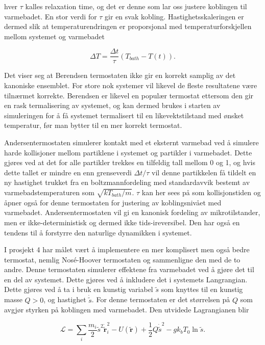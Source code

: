 \documentclass[a4paper,10pt]{article}
\newcommand{\Lagr}{\mathcal{L}}
\begin{document}
hver $\tau$ kalles relaxation time, og det er denne som lar oss justere koblingen til varmebadet. En stor verdi for $\tau$ gir en svak kobling. Hastighetsskaleringen er dermed slik at temperaturendringen er proporsjonal med temperaturforskjellen mellom systemet og varmebadet

\begin{equation}
 \Delta T = \frac{\Delta t}{\tau}(T_{bath} - T(t)).
\end{equation}

Det viser seg at Berendsen termostaten ikke gir en korrekt samplig av det kanoniske ensemblet. For store nok systemer vil likevel de fleste resultatene være tilnærmet korrekte. Berendsen er likevel en populær termostat ettersom den gir en rask termalisering av systemet, og kan dermed brukes i starten av simuleringen for å få systemet termalisert til en likevektstilstand med ønsket temperatur, før man bytter til en mer korrekt termostat.

Andersentermostaten simulerer kontakt med et eksternt varmebad ved å simulere harde kollisjoner mellom partiklene i systemet og partikler i varmebadet. Dette gjøres ved at det for alle partikler trekkes en tilfeldig tall mellom 0 og 1, og hvis dette tallet er mindre en enn grenseverdi $\Delta t/\tau$ vil denne partikkelen få tildelt en ny hastighet trukket fra en boltzmannfordeling med standardavvik bestemt av varmebadstemperaturen som $\sqrt{kT_{bath}/m}$. $\tau$ kan her sees på som kollisjonstiden og åpner også for denne termostaten for justering av koblingsnivået med varmebadet. Andersentermostaten vil gi en kanonisk fordeling av mikrotilstander, men er ikke-deterministisk og dermed ikke tids-ireversibel. Den har også en tendens til å forstyrre den naturlige dynamikken i systemet. 

I prosjekt 4 har målet vært å implementere en mer komplisert men også bedre termostat, nemlig Nosé-Hoover termostaten og sammenligne den med de to andre. Denne termostaten simulerer effektene fra varmebadet ved å gjøre det til en del av systemet. Dette gjøres ved å inkludere det i systemets Langrangian. Dette gjøres ved å ta i bruk en kunstig variabel $\tilde{s}$ som knyttes til en kunstig masse $Q>0$, og hastighet $\dot{\tilde{s}}$. For denne termostaten er det størrelsen på $Q$ som avgjør styrken på koblingen med varmebadet. Den utvidede Lagrangianen blir 

\begin{equation}
 \Lagr = \sum_i\frac{m_i}{2}\tilde{s}^2\mathbf{\dot{\tilde{r}}}_i^2 - U(\mathbf{\tilde{r}}) + \frac{1}{2}Q\dot{\tilde{s}}^2-gk_bT_0\ln \tilde{s}.
\end{equation}
\end{document}
